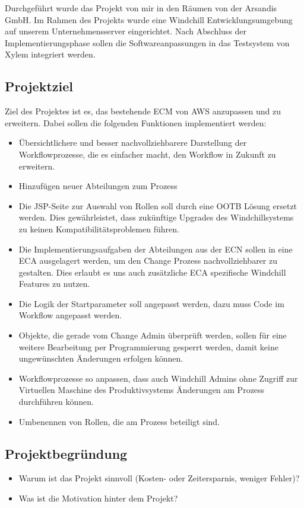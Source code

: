 Durchgeführt wurde das Projekt von mir in den Räumen von der Arsandis GmbH.
Im Rahmen des Projekts wurde eine Windchill Entwicklungsumgebung auf unserem Unternehmensserver eingerichtet.
Nach Abschluss der Implementierungsphase sollen die Softwareanpassungen in das Testsystem von Xylem integriert werden.

\subsection{Projektziel} 
\label{sec:Projektziel}
Ziel des Projektes ist es, das bestehende \ac{ECM} von \ac{AWS} anzupassen und zu erweitern.
Dabei sollen die folgenden Funktionen implementiert werden:
\begin{itemize}
	\item Übersichtlichere und besser nachvollziehbarere Darstellung der Workflowprozesse, die es einfacher macht, den Workflow in Zukunft zu erweitern.
	\item Hinzufügen neuer Abteilungen zum Prozess
	\item Die \ac{JSP}-Seite zur Auswahl von Rollen soll durch eine \ac{OOTB} Lösung ersetzt werden.
	Dies gewährleistet, dass zukünftige Upgrades des Windchillsystems zu keinen Kompatibilitätsproblemen führen.
	\item Die Implementierungsaufgaben der Abteilungen aus der \ac{ECN} sollen in eine \ac{ECA} ausgelagert werden, um den Change Prozess nachvollziehbarer zu gestalten.
	Dies erlaubt es uns auch zusätzliche \ac{ECA} spezifische Windchill Features zu nutzen.
	\item Die Logik der Startparameter soll angepasst werden, dazu muss Code im Workflow angepasst werden.
	\item Objekte, die gerade vom Change Admin überprüft werden, sollen für eine weitere Bearbeitung per Programmierung gesperrt werden, damit keine ungewünschten Änderungen erfolgen können.
	\item Workflowprozesse so anpassen, dass auch Windchill Admins ohne Zugriff zur Virtuellen Maschine des Produktivsystems Änderungen am Prozess durchführen können.
	\item Umbenennen von Rollen, die am Prozess beteiligt sind.
\end{itemize}

\subsection{Projektbegründung} 
\label{sec:Projektbegruendung}
\begin{itemize}
	\item Warum ist das Projekt sinnvoll (\zB Kosten- oder Zeitersparnis, weniger Fehler)?
	\item Was ist die Motivation hinter dem Projekt?
\end{itemize}


